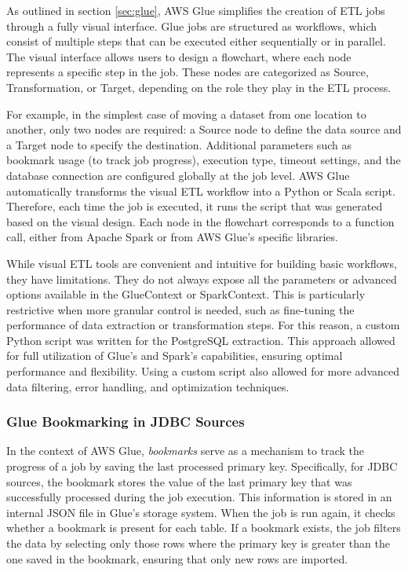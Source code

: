 As outlined in section \ref{sec:glue}, \ac{AWS} Glue simplifies the creation of \ac{ETL} jobs through a fully visual interface. Glue jobs are structured as workflows, which consist of multiple steps that can be executed either sequentially or in parallel. The visual interface allows users to design a flowchart, where each node represents a specific step in the job. These nodes are categorized as Source, Transformation, or Target, depending on the role they play in the \ac{ETL} process.

For example, in the simplest case of moving a dataset from one location to another, only two nodes are required: a Source node to define the data source and a Target node to specify the destination. Additional parameters such as bookmark usage (to track job progress), execution type, timeout settings, and the database connection are configured globally at the job level. \ac{AWS} Glue automatically transforms the visual \ac{ETL} workflow into a Python or Scala script. Therefore, each time the job is executed, it runs the script that was generated based on the visual design. Each node in the flowchart corresponds to a function call, either from Apache Spark or from \ac{AWS} Glue's specific libraries.

While visual \ac{ETL} tools are convenient and intuitive for building basic workflows, they have limitations. They do not always expose all the parameters or advanced options available in the GlueContext or SparkContext. This is particularly restrictive when more granular control is needed, such as fine-tuning the performance of data extraction or transformation steps. For this reason, a custom Python script was written for the PostgreSQL extraction. This approach allowed for full utilization of Glue's and Spark's capabilities, ensuring optimal performance and flexibility. Using a custom script also allowed for more advanced data filtering, error handling, and optimization techniques.


\subsubsection{Glue Bookmarking in JDBC Sources}

In the context of \ac{AWS} Glue, \textit{bookmarks} serve as a mechanism to track the progress of a job by saving the last processed primary key. Specifically, for \ac{JDBC} sources, the bookmark stores the value of the last primary key that was successfully processed during the job execution. This information is stored in an internal \ac{JSON} file in Glue's storage system. When the job is run again, it checks whether a bookmark is present for each table. If a bookmark exists, the job filters the data by selecting only those rows where the primary key is greater than the one saved in the bookmark, ensuring that only new rows are imported.

